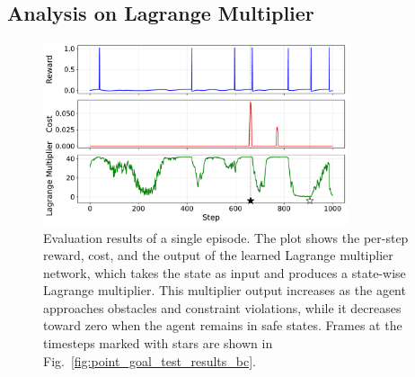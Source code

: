 \subsection{Analysis on Lagrange Multiplier}

\begin{figure}[H]
    \centering
    \includegraphics[width=0.8\textwidth]{figure/test/result.pdf}
    \caption{Evaluation results of a single episode.
            The plot shows the per-step reward, cost, and the output of the learned Lagrange multiplier network, which takes the state as input and produces a state-wise Lagrange multiplier.
            This multiplier output increases as the agent approaches obstacles and constraint violations, while it decreases toward zero when the agent remains in safe states.
            Frames at the timesteps marked with stars are shown in Fig.~\ref{fig:point_goal_test_results_bc}.}
    \label{fig:point_goal_test_results_a}
\end{figure}

